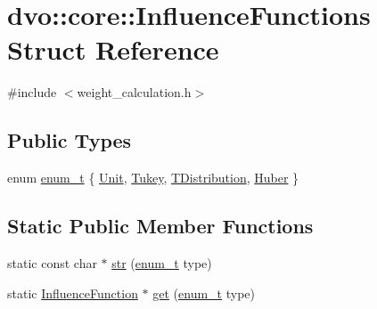 \hypertarget{structdvo_1_1core_1_1_influence_functions}{}\section{dvo\+:\+:core\+:\+:Influence\+Functions Struct Reference}
\label{structdvo_1_1core_1_1_influence_functions}


{\ttfamily \#include $<$weight\+\_\+calculation.\+h$>$}

\subsection*{Public Types}
\begin{DoxyCompactItemize}
\item 
enum \mbox{\hyperlink{structdvo_1_1core_1_1_influence_functions_a3fcb0831eb60e196888641a64fff665f}{enum\+\_\+t}} \{ \mbox{\hyperlink{structdvo_1_1core_1_1_influence_functions_a3fcb0831eb60e196888641a64fff665fad6ecc10a1c8928ad9a04636767dc31ff}{Unit}}, 
\mbox{\hyperlink{structdvo_1_1core_1_1_influence_functions_a3fcb0831eb60e196888641a64fff665fa4e74b42ef5f913e5bccd76f99cff1b35}{Tukey}}, 
\mbox{\hyperlink{structdvo_1_1core_1_1_influence_functions_a3fcb0831eb60e196888641a64fff665fa1d6bb04358a6bff2a7ae677ca16d74ad}{T\+Distribution}}, 
\mbox{\hyperlink{structdvo_1_1core_1_1_influence_functions_a3fcb0831eb60e196888641a64fff665fa2fe080ac9523516feeab8e7b3be9ad65}{Huber}}
 \}
\end{DoxyCompactItemize}
\subsection*{Static Public Member Functions}
\begin{DoxyCompactItemize}
\item 
static const char $\ast$ \mbox{\hyperlink{structdvo_1_1core_1_1_influence_functions_a8440157ce492ecc76e375d637a194db9}{str}} (\mbox{\hyperlink{structdvo_1_1core_1_1_influence_functions_a3fcb0831eb60e196888641a64fff665f}{enum\+\_\+t}} type)
\item 
static \mbox{\hyperlink{classdvo_1_1core_1_1_influence_function}{Influence\+Function}} $\ast$ \mbox{\hyperlink{structdvo_1_1core_1_1_influence_functions_a85f28604630e98484cc8534fea623c86}{get}} (\mbox{\hyperlink{structdvo_1_1core_1_1_influence_functions_a3fcb0831eb60e196888641a64fff665f}{enum\+\_\+t}} type)
\end{DoxyCompactItemize}


